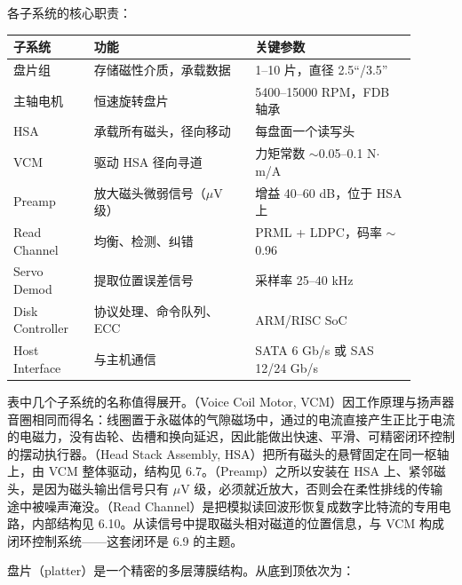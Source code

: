 各子系统的核心职责：

\begin{longtable}{L{0.18\linewidth}L{0.36\linewidth}L{0.36\linewidth}}
\toprule
子系统 & 功能 & 关键参数 \\
\midrule
盘片组 & 存储磁性介质，承载数据 & 1--10 片，直径 2.5“/3.5” \\\tablerowrule
主轴电机 & 恒速旋转盘片 & 5400--15000 RPM，FDB 轴承 \\\tablerowrule
HSA & 承载所有磁头，径向移动 & 每盘面一个读写头 \\\tablerowrule
VCM & 驱动 HSA 径向寻道 & 力矩常数 $\sim$0.05--0.1 N$\cdot$m/A \\\tablerowrule
Preamp & 放大磁头微弱信号（$\mu$V 级） & 增益 40--60 dB，位于 HSA 上 \\\tablerowrule
Read Channel & 均衡、检测、纠错 & PRML + LDPC，码率 $\sim$0.96 \\\tablerowrule
Servo Demod & 提取位置误差信号 & 采样率 25--40 kHz \\\tablerowrule
Disk Controller & 协议处理、命令队列、ECC & ARM/RISC SoC \\\tablerowrule
Host Interface & 与主机通信 & SATA 6 Gb/s 或 SAS 12/24 Gb/s \\
\bottomrule
\end{longtable}

表中几个子系统的名称值得展开。（Voice Coil Motor, VCM）因工作原理与扬声器音圈相同而得名：线圈置于永磁体的气隙磁场中，通过的电流直接产生正比于电流的电磁力，没有齿轮、齿槽和换向延迟，因此能做出快速、平滑、可精密闭环控制的摆动执行器。（Head Stack Assembly, HSA）把所有磁头的悬臂固定在同一枢轴上，由 VCM 整体驱动，结构见 6.7。（Preamp）之所以安装在 HSA 上、紧邻磁头，是因为磁头输出信号只有 $\mu$V 级，必须就近放大，否则会在柔性排线的传输途中被噪声淹没。（Read Channel）是把模拟读回波形恢复成数字比特流的专用电路，内部结构见 6.10。从读信号中提取磁头相对磁道的位置信息，与 VCM 构成闭环控制系统——这套闭环是 6.9 的主题。


盘片（platter）是一个精密的多层薄膜结构。从底到顶依次为：

